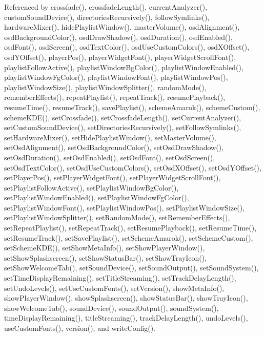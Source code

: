 Referenced by crossfade(), crossfade\-Length(), current\-Analyzer(), custom\-Sound\-Device(), directories\-Recursively(), follow\-Symlinks(), hardware\-Mixer(), hide\-Playlist\-Window(), master\-Volume(), osd\-Alignment(), osd\-Background\-Color(), osd\-Draw\-Shadow(), osd\-Duration(), osd\-Enabled(), osd\-Font(), osd\-Screen(), osd\-Text\-Color(), osd\-Use\-Custom\-Colors(), osd\-XOffset(), osd\-YOffset(), player\-Pos(), player\-Widget\-Font(), player\-Widget\-Scroll\-Font(), playlist\-Follow\-Active(), playlist\-Window\-Bg\-Color(), playlist\-Window\-Enabled(), playlist\-Window\-Fg\-Color(), playlist\-Window\-Font(), playlist\-Window\-Pos(), playlist\-Window\-Size(), playlist\-Window\-Splitter(), random\-Mode(), remember\-Effects(), repeat\-Playlist(), repeat\-Track(), resume\-Playback(), resume\-Time(), resume\-Track(), save\-Playlist(), scheme\-Amarok(), scheme\-Custom(), scheme\-KDE(), set\-Crossfade(), set\-Crossfade\-Length(), set\-Current\-Analyzer(), set\-Custom\-Sound\-Device(), set\-Directories\-Recursively(), set\-Follow\-Symlinks(), set\-Hardware\-Mixer(), set\-Hide\-Playlist\-Window(), set\-Master\-Volume(), set\-Osd\-Alignment(), set\-Osd\-Background\-Color(), set\-Osd\-Draw\-Shadow(), set\-Osd\-Duration(), set\-Osd\-Enabled(), set\-Osd\-Font(), set\-Osd\-Screen(), set\-Osd\-Text\-Color(), set\-Osd\-Use\-Custom\-Colors(), set\-Osd\-XOffset(), set\-Osd\-YOffset(), set\-Player\-Pos(), set\-Player\-Widget\-Font(), set\-Player\-Widget\-Scroll\-Font(), set\-Playlist\-Follow\-Active(), set\-Playlist\-Window\-Bg\-Color(), set\-Playlist\-Window\-Enabled(), set\-Playlist\-Window\-Fg\-Color(), set\-Playlist\-Window\-Font(), set\-Playlist\-Window\-Pos(), set\-Playlist\-Window\-Size(), set\-Playlist\-Window\-Splitter(), set\-Random\-Mode(), set\-Remember\-Effects(), set\-Repeat\-Playlist(), set\-Repeat\-Track(), set\-Resume\-Playback(), set\-Resume\-Time(), set\-Resume\-Track(), set\-Save\-Playlist(), set\-Scheme\-Amarok(), set\-Scheme\-Custom(), set\-Scheme\-KDE(), set\-Show\-Meta\-Info(), set\-Show\-Player\-Window(), set\-Show\-Splashscreen(), set\-Show\-Status\-Bar(), set\-Show\-Tray\-Icon(), set\-Show\-Welcome\-Tab(), set\-Sound\-Device(), set\-Sound\-Output(), set\-Sound\-System(), set\-Time\-Display\-Remaining(), set\-Title\-Streaming(), set\-Track\-Delay\-Length(), set\-Undo\-Levels(), set\-Use\-Custom\-Fonts(), set\-Version(), show\-Meta\-Info(), show\-Player\-Window(), show\-Splashscreen(), show\-Status\-Bar(), show\-Tray\-Icon(), show\-Welcome\-Tab(), sound\-Device(), sound\-Output(), sound\-System(), time\-Display\-Remaining(), title\-Streaming(), track\-Delay\-Length(), undo\-Levels(), use\-Custom\-Fonts(), version(), and write\-Config().



